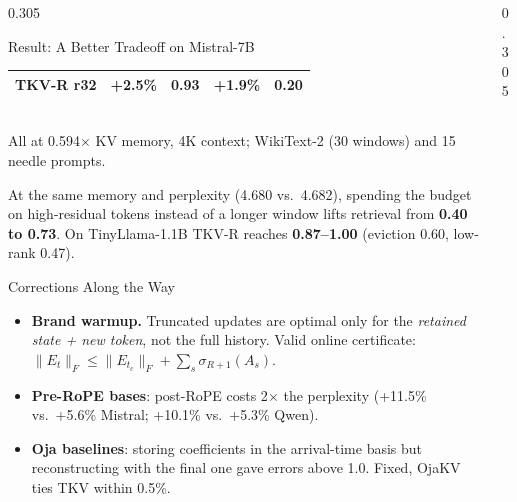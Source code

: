 \documentclass[final]{beamer}
\begin{document}
\begin{frame}[t]
\begin{columns}[t]
\begin{column}{0.305\paperwidth}
\begin{block}{Result: A Better Tradeoff on Mistral-7B}
\begin{center}
\begin{tabular}{lcccc}
\textbf{\color{accent}TKV-R r32} & +2.5\% & \textbf{0.93} & +1.9\% & 0.20 \\
\bottomrule
\end{tabular}\\[0.2cm]
{\footnotesize\color{muted} All at 0.594$\times$ KV memory, 4K context; WikiText-2 (30 windows) and 15 needle prompts.}
\end{center}
\vspace{0.2cm}
At the same memory and perplexity (4.680 vs.\ 4.682), spending the budget on
high-residual tokens instead of a longer window lifts retrieval from
\textbf{0.40 to 0.73}. On TinyLlama-1.1B TKV-R reaches \textbf{0.87--1.00}
(eviction 0.60, low-rank 0.47).
\end{block}

\begin{block}{Corrections Along the Way}
\begin{itemize}
  \item \textbf{Brand warmup.} Truncated updates are optimal only for the \emph{retained state + new token}, not the full history. Valid online certificate: $\lVert E_t\rVert_F \le \lVert E_{t_c}\rVert_F + \sum_s \sigma_{R+1}(A_s)$.
  \item \textbf{Pre-RoPE bases}: post-RoPE costs 2$\times$ the perplexity (+11.5\% vs.\ +5.6\% Mistral; +10.1\% vs.\ +5.3\% Qwen).
  \item \textbf{Oja baselines}: storing coefficients in the arrival-time basis but reconstructing with the final one gave errors above 1.0. Fixed, OjaKV ties TKV within 0.5\%.
\end{itemize}
\end{block}

\end{column}

\begin{column}{0.305\paperwidth}


\end{column}
\end{columns}
\end{frame}
\end{document}
